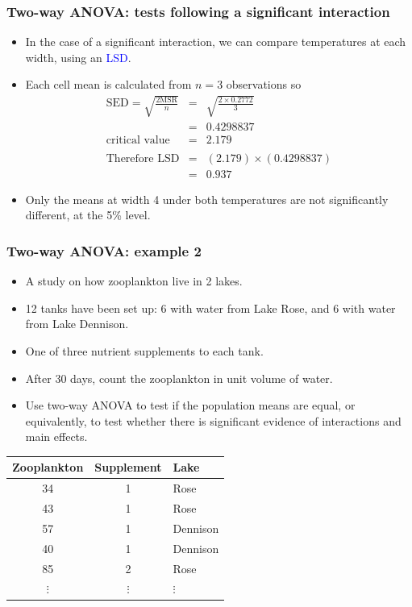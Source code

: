 \documentclass[12pt,xcolor=dvipsnames,handout,mathserif,aspectratio=169]{beamer}
\newcommand{\tc}{\textcolor}
\begin{document}
\begin{frame}
\frametitle{Two-way ANOVA: tests following a significant interaction}
\begin{itemize}
\item In the case of a significant interaction, we can compare temperatures at each width, using an \tc{blue}{LSD}.
\vspace{0.2cm}
\item Each cell mean is calculated from $n  = 3$ observations so
\begin{eqnarray*}
\mbox{SED}  = \sqrt{\frac{2\mbox{MSR}}{n}}
 & = & \sqrt{\frac{2 \times 0.2772}{3}} \\
&=& 0.4298837\\
\mbox{critical value} &=& 2.179\\ \\
\mbox{Therefore LSD} &=& (2.179)\times(0.4298837)\\
&=&  0.937
\end{eqnarray*}
\item Only the means at width 4 under both temperatures are not significantly different, at the 5\% level.
\end{itemize}
\end{frame}

\begin{frame}
\frametitle{Two-way ANOVA: example 2} 
\begin{itemize}
\item A study on how zooplankton live in 2 lakes. 
\item 12 tanks have been set up: 6 with water from Lake Rose, and 6 with water from Lake Dennison. 
\item One of three nutrient supplements to each tank.
\item After 30 days, count the zooplankton in unit volume of water.  
\item Use two-way ANOVA to test if the population means are equal, or equivalently, to test whether there is significant evidence of interactions and main effects.
\end{itemize}
\begin{center}
\begin{tabular}{ccl}\hline
Zooplankton	&Supplement	&Lake\\\hline
34	&1&	Rose\\
43	&1	&Rose\\
57	&1	&Dennison\\
40	&1	&Dennison\\
85	&2	&Rose\\
$\vdots$	&$\vdots$	&$\vdots$\\
\end{tabular}
\end{center}
\end{frame}
\end{document}
